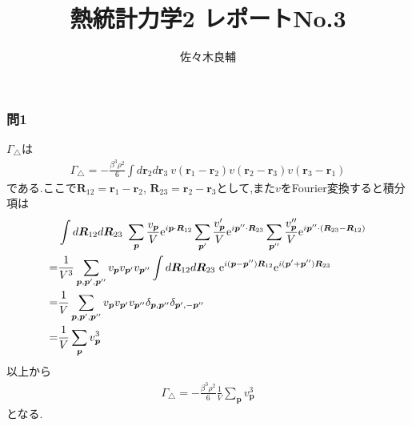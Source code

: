 \documentclass[uplatex,a4j,11pt,dvipdfmx]{jsarticle}
\begin{document}
\title{熱統計力学2 レポートNo.3}
\author{佐々木良輔}
\date{}
\maketitle
\subsubsection*{問1}
$\Gamma_\triangle$は
\begin{align}
  \Gamma_\triangle=-\frac{\beta^3\rho^2}{6}\int d{\bm r}_2d{\bm r}_3\ v({\bm r}_1-{\bm r}_2)v({\bm r}_2-{\bm r}_3)v({\bm r}_3-{\bm r}_1)
\end{align}
である.ここで${\bm R}_{12}={\bm r}_1-{\bm r}_2$, ${\bm R}_{23}={\bm r}_2-{\bm r}_3$として,また$v$をFourier変換すると積分項は
\begin{align}
  \begin{split}
    &\int d{\bm R}_{12}d{\bm R}_{23}\ \sum_{\bm p}\frac{v_{\bm p}}{V}{\rm e}^{i{\bm p}\cdot{\bm R}_{12}}
    \sum_{\bm p'}\frac{v_{\bm p}'}{V}{\rm e}^{i{\bm p''}\cdot{\bm R}_{23}}
    \sum_{\bm p''}\frac{v_{\bm p}''}{V}{\rm e}^{i{\bm p''}\cdot({\bm R}_{23}-{\bm R}_{12})}\\
    =&\frac{1}{V^3}\sum_{{\bm p},{\bm p}',{\bm p}''}v_{\bm p}v_{\bm p'}v_{\bm p''}
    \int d{\bm R}_{12}d{\bm R}_{23}\ {\rm e}^{i({\bm p}-{\bm p''}){\bm R}_{12}}{\rm e}^{i({\bm p'}+{\bm p''}){\bm R}_{23}}\\
    =&\frac{1}{V}\sum_{{\bm p},{\bm p}',{\bm p}''}v_{\bm p}v_{\bm p'}v_{\bm p''}\delta_{{\bm p},{\bm p}''}\delta_{{\bm p'},-{\bm p}''}\\
    =&\frac{1}{V}\sum_{\bm p}v_{\bm p}^3
  \end{split}
\end{align}
以上から
\begin{align}
  \Gamma_\triangle=-\frac{\beta^3\rho^2}{6}\frac{1}{V}\sum_{\bm p}v_{\bm p}^3
\end{align}
となる.
\end{document}
